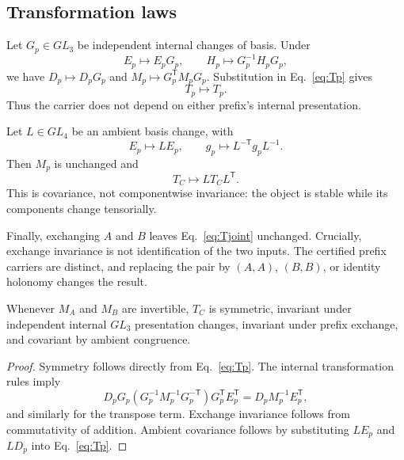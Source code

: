 \subsection{Transformation laws}

Let $G_p\in GL_3$ be independent internal changes of basis. Under
\begin{equation}\label{eq:internalgauge}
 E_p\mapsto E_pG_p,\qquad
 H_p\mapsto G_p^{-1}H_pG_p,
\end{equation}
we have $D_p\mapsto D_pG_p$ and $M_p\mapsto G_p^{\mathsf T}M_pG_p$. Substitution in Eq.~\eqref{eq:Tp} gives
\begin{equation}\label{eq:gaugeinvariance}
 T_p\mapsto T_p.
\end{equation}
Thus the carrier does not depend on either prefix's internal presentation.

Let $L\in GL_4$ be an ambient basis change, with
\begin{equation}
 E_p\mapsto LE_p,\qquad g_p\mapsto L^{-\mathsf T}g_pL^{-1}.
\end{equation}
Then $M_p$ is unchanged and
\begin{equation}\label{eq:ambientcovariance}
 T_C\mapsto LT_CL^{\mathsf T}.
\end{equation}
This is covariance, not componentwise invariance: the object is stable while its components change tensorially.

Finally, exchanging $A$ and $B$ leaves Eq.~\eqref{eq:Tjoint} unchanged. Crucially, exchange invariance is not identification of the two inputs. The certified prefix carriers are distinct, and replacing the pair by $(A,A)$, $(B,B)$, or identity holonomy changes the result.

\begin{proposition}\label{prop:structural}
Whenever $M_A$ and $M_B$ are invertible, $T_C$ is symmetric, invariant under independent internal $GL_3$ presentation changes, invariant under prefix exchange, and covariant by ambient congruence.
\end{proposition}

\begin{proof}
Symmetry follows directly from Eq.~\eqref{eq:Tp}. The internal transformation rules imply
\[
 D_pG_p(G_p^{-1}M_p^{-1}G_p^{-\mathsf T})G_p^{\mathsf T}E_p^{\mathsf T}
 =D_pM_p^{-1}E_p^{\mathsf T},
\]
and similarly for the transpose term. Exchange invariance follows from commutativity of addition. Ambient covariance follows by substituting $LE_p$ and $LD_p$ into Eq.~\eqref{eq:Tp}.
\end{proof}


